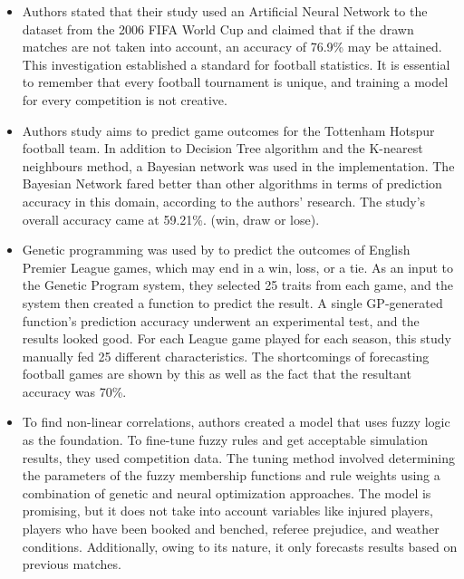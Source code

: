 \begin{itemize}
    \item Authors \citeauthor{5596458} \cite{5596458} stated that their study used an Artificial Neural Network to the dataset from the 2006 FIFA World Cup and claimed that if the drawn matches are not taken into account, an accuracy of 76.9\% may be attained. This investigation established a standard for football statistics. It is essential to remember that every football tournament is unique, and training a model for every competition is not creative. 
    \item Authors \citeauthor{joseph2006predicting} \cite{joseph2006predicting} study aims to predict game outcomes for the Tottenham Hotspur football team. In addition to Decision Tree algorithm and the K-nearest neighbours method, a Bayesian network was used in the implementation. The Bayesian Network fared better than other algorithms in terms of prediction accuracy in this domain, according to the authors' research. The study's overall accuracy came at 59.21\%. (win, draw or lose). 
    \item  Genetic programming was used by \citeauthor{6604116} \cite{6604116} to predict the outcomes of English Premier League games, which may end in a win, loss, or a tie. As an input to the Genetic Program system, they selected 25 traits from each game, and the system then created a function to predict the result. A single GP-generated function's prediction accuracy underwent an experimental test, and the results looked good. For each League game played for each season, this study manually fed 25 different characteristics. The shortcomings of forecasting football games are shown by this as well as the fact that the resultant accuracy was 70\%. 
    \item To find non-linear correlations, authors \citeauthor{rotshtein2005football} \cite{rotshtein2005football} created a model that uses fuzzy logic as the foundation. To fine-tune fuzzy rules and get acceptable simulation results, they used competition data. The tuning method involved determining the parameters of the fuzzy membership functions and rule weights using a combination of genetic and neural optimization approaches. The model is promising, but it does not take into account variables like injured players, players who have been booked and benched, referee prejudice, and weather conditions. Additionally, owing to its nature, it only forecasts results based on previous matches. 
\end{itemize}

